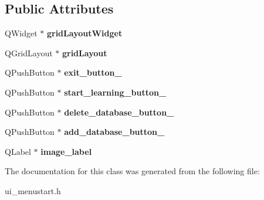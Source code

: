 \subsection*{Public Attributes}
\begin{DoxyCompactItemize}
\item 
\mbox{\label{class_ui___menu_start_a77bad3a33dc6bfef2b26b75970666b0c}} 
Q\+Widget $\ast$ {\bfseries grid\+Layout\+Widget}
\item 
\mbox{\label{class_ui___menu_start_ab8cc6201812de4b859d4962848c60f04}} 
Q\+Grid\+Layout $\ast$ {\bfseries grid\+Layout}
\item 
\mbox{\label{class_ui___menu_start_ac5bfb452ffedd7c21009ea5eb49a8fc5}} 
Q\+Push\+Button $\ast$ {\bfseries exit\+\_\+button\+\_\+}
\item 
\mbox{\label{class_ui___menu_start_a951fba3ccfea001747e4e291ca7d32da}} 
Q\+Push\+Button $\ast$ {\bfseries start\+\_\+learning\+\_\+button\+\_\+}
\item 
\mbox{\label{class_ui___menu_start_a7c46ec686b19734be2ab86f66a95906a}} 
Q\+Push\+Button $\ast$ {\bfseries delete\+\_\+database\+\_\+button\+\_\+}
\item 
\mbox{\label{class_ui___menu_start_a32321cdffe5f4f100e3f0c5ddc83dd2f}} 
Q\+Push\+Button $\ast$ {\bfseries add\+\_\+database\+\_\+button\+\_\+}
\item 
\mbox{\label{class_ui___menu_start_a9ee615f94113d4577eafdbb39cc4f0a2}} 
Q\+Label $\ast$ {\bfseries image\+\_\+label}
\end{DoxyCompactItemize}


The documentation for this class was generated from the following file\+:\begin{DoxyCompactItemize}
\item 
ui\+\_\+menustart.\+h\end{DoxyCompactItemize}
